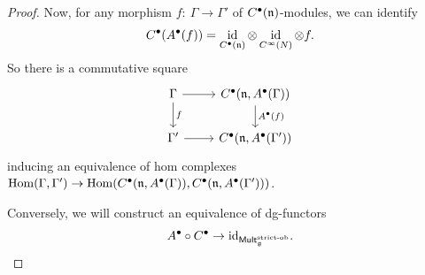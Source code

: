 \documentclass[11pt]{article}
\numberwithin{equation}{section}
\numberwithin{equation}{section}
\def\cat#1{\ensuremath{\mathsf{#1}}}
\DeclareMathOperator{\Mult}{\cat{Mult}}
\def\bu{\bullet}
\DeclareMathOperator{\id}{id}
\begin{document}
\begin{proof}
	Now, for any morphism $f \colon \ \Gamma \to \Gamma'$ of $C^\bullet(\mathfrak n)$-modules, we can identify
	\begin{equation*}
	C^\bu(A^\bu(f)) = \id_{C^\bu(\fn)} \otimes \id_{C^\infty(N)} \otimes f.
	\end{equation*}
	So there is a commutative square
	\begin{equation*}
	\begin{tikzcd}
	\Gamma \arrow[d , "f"] \arrow[r] & C^\bullet(\fn , A^\bullet(\Gamma)) \arrow[d, "A^\bullet(f)"] \\
	\Gamma' \arrow[r] &C^\bullet(\fn , A^\bullet(\Gamma'))
	\end{tikzcd}
	\end{equation*}
	inducing an equivalence of hom complexes $\mathrm{Hom}(\Gamma, \Gamma') \to \mathrm{Hom}(C^\bullet(\mathfrak n , A^\bullet(\Gamma)), C^\bullet(\mathfrak n , A^\bullet(\Gamma')))$.
	
	
	Conversely, we will construct an equivalence of dg-functors
	\begin{equation*}
	A^\bullet \circ C^\bullet \to \mathrm{id}_{\Mult_\fg^{\text{\rm strict-ob}}} .
	\end{equation*}
	

\end{proof}
\end{document}
